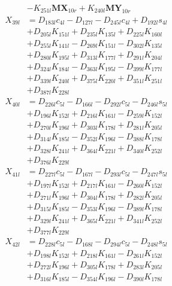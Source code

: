 \begin{multicols}{2}
\begin{align}
&- K_{251l}\mathbf{MX}_{10r} + K_{240l}\mathbf{MY}_{10r} \nonumber \\
X_{39l} &= D_{183l}c_{4l} - D_{127l} - D_{245l}c_{4l} + D_{192l}s_{4l}  \nonumber \\
&+ D_{205l}K_{151l} + D_{235l}K_{135l} + D_{225l}K_{160l}  \nonumber \\
&+ D_{255l}K_{141l} - D_{269l}K_{151l} - D_{302l}K_{135l}  \nonumber \\
&+ D_{280l}K_{195l} + D_{313l}K_{177l} + D_{291l}K_{204l}  \nonumber \\
&+ D_{324l}K_{184l} - D_{363l}K_{195l} - D_{399l}K_{177l}  \nonumber \\
&+ D_{339l}K_{240l} + D_{375l}K_{220l} + D_{351l}K_{251l}  \nonumber \\
&+ D_{387l}K_{228l} \nonumber \\
X_{40l} &= D_{226l}c_{5l} - D_{166l} - D_{292l}c_{5l} - D_{246l}s_{5l}  \nonumber \\
&+ D_{196l}K_{152l} + D_{216l}K_{161l} - D_{259l}K_{152l}  \nonumber \\
&+ D_{270l}K_{196l} + D_{303l}K_{178l} + D_{281l}K_{205l}  \nonumber \\
&+ D_{314l}K_{185l} - D_{352l}K_{196l} - D_{388l}K_{178l}  \nonumber \\
&+ D_{328l}K_{241l} + D_{364l}K_{221l} + D_{340l}K_{252l}  \nonumber \\
&+ D_{376l}K_{229l} \nonumber \\
X_{41l} &= D_{227l}c_{5l} - D_{167l} - D_{293l}c_{5l} - D_{247l}s_{5l}  \nonumber \\
&+ D_{197l}K_{152l} + D_{217l}K_{161l} - D_{260l}K_{152l}  \nonumber \\
&+ D_{271l}K_{196l} + D_{304l}K_{178l} + D_{282l}K_{205l}  \nonumber \\
&+ D_{315l}K_{185l} - D_{353l}K_{196l} - D_{389l}K_{178l}  \nonumber \\
&+ D_{329l}K_{241l} + D_{365l}K_{221l} + D_{341l}K_{252l}  \nonumber \\
&+ D_{377l}K_{229l} \nonumber \\
X_{42l} &= D_{228l}c_{5l} - D_{168l} - D_{294l}c_{5l} - D_{248l}s_{5l}  \nonumber \\
&+ D_{198l}K_{152l} + D_{218l}K_{161l} - D_{261l}K_{152l}  \nonumber \\
&+ D_{272l}K_{196l} + D_{305l}K_{178l} + D_{283l}K_{205l}  \nonumber \\
&+ D_{316l}K_{185l} - D_{354l}K_{196l} - D_{390l}K_{178l}  \nonumber \\

\end{align}
\end{multicols}
